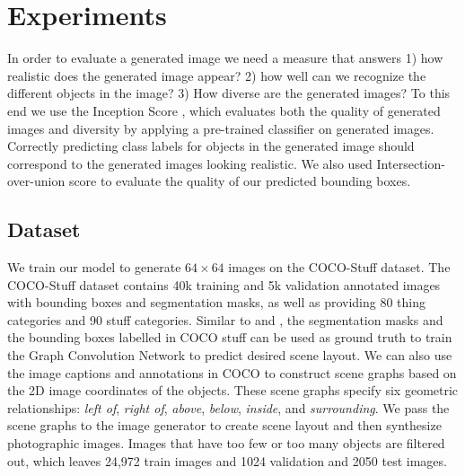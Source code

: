 \documentclass{article}
\begin{document}
\section{Experiments}
In order to evaluate a generated image we need a measure that answers 1) how realistic does the generated image appear? 2) how well can we recognize the different objects in the image? 3) How diverse are the generated images? To this end we use the Inception Score \cite{inception}\cite{inceptionscorer}, which evaluates both the quality of generated images and diversity by applying a pre-trained classifier on generated images. Correctly predicting class labels for objects in the generated image should correspond to the generated images looking realistic. We also used Intersection-over-union score to evaluate the quality of our predicted bounding boxes.

\subsection{Dataset}
We train our model to generate $64 \times 64$ images on the COCO-Stuff \cite{cocostuff} dataset. The COCO-Stuff dataset contains 40k training and 5k validation annotated images with bounding boxes and segmentation masks, as well as providing 80 thing categories and 90 stuff categories. Similar to \cite{sg2im} and \cite{sg2imgcontext}, the segmentation masks and the bounding boxes labelled in COCO stuff can be used as ground truth to train the Graph Convolution Network to predict desired scene layout. We can also use the image captions and annotations in COCO to construct scene graphs based on the 2D image coordinates of the objects. These scene graphs specify six geometric relationships: \textit{left of}, \textit{right of}, \textit{above}, \textit{below}, \textit{inside}, and \textit{surrounding}. We pass the scene graphs to the image generator to create scene layout and then synthesize photographic images. Images that have too few or too many objects are filtered out, which leaves 24,972 train images and 1024 validation and 2050 test images.
\end{document}
